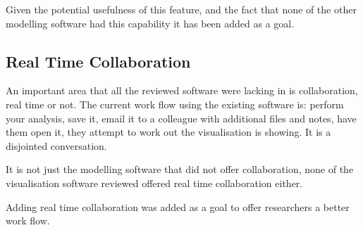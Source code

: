 Given the potential usefulness of this feature, and the fact that none of the other modelling software had this capability it has been added as a goal.

\subsection{Real Time Collaboration}

An important area that all the reviewed software were lacking in is collaboration, real time or not.  The current work flow using the existing software is: perform your analysis, save it, email it to a colleague with additional files and notes, have them open it, they attempt to work out the visualisation is showing.  It is a disjointed conversation.

It is not just the modelling software that did not offer collaboration, none of the visualisation software reviewed offered real time collaboration either.

Adding real time collaboration was added as a goal to offer researchers a better work flow.
